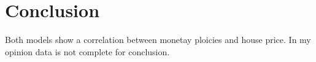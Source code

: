 \section{Conclusion}
Both models show a correlation between monetay ploicies and house price. In my opinion data is not complete for conclusion. 